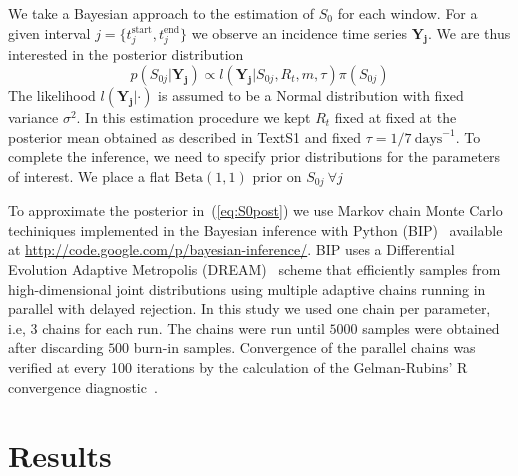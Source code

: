 We take a Bayesian approach to the estimation of $S_0$ for each window.
For a given interval $j = \{ t_j^{\text{start}}, t_j^{\text{end}} \} $ we 
observe an incidence time series $\mathbf{Y_{j}}$.
We are thus interested in the posterior distribution
\begin{equation}
 \label{eq:S0post}
 p(S_{0j}|\mathbf{Y_{j}}) \propto l(\mathbf{Y_{j}}|S_{0j}, R_t, m,  \tau 
)\pi(S_{0j}) 
\end{equation}
The likelihood $l(\mathbf{Y_{j}}|\cdot)$ is assumed to be a Normal distribution 
with fixed variance $\sigma^2$.
In this estimation procedure we kept $R_t$ fixed at fixed at the posterior mean 
obtained as described in TextS1 and fixed $\tau = 1/7\: \text{days}^{-1}$.
To complete the inference, we need to specify prior distributions for the 
parameters of interest.
We place a flat $\text{Beta}(1, 1)$ prior on $S_{0j}\:\forall j$
% 



To approximate the posterior in~(\ref{eq:S0post}) we use Markov chain Monte 
Carlo techiniques implemented in the Bayesian inference with Python 
(BIP)~\cite{pone2011} available at 
\url{http://code.google.com/p/bayesian-inference/}.
BIP uses a Differential Evolution Adaptive Metropolis (DREAM)~\cite{vrugt2008} 
scheme that efficiently samples from high-dimensional joint distributions using 
multiple adaptive chains running in parallel with delayed rejection.
In this study we used one chain per parameter, i.e, 3 chains for each run.
The chains were run until $5000$ samples were obtained after discarding $500$ 
burn-in samples.
Convergence of the parallel chains was verified at every 100 iterations by the 
calculation of the Gelman-Rubins' R convergence diagnostic~\cite{brooks1998}.
\section*{Results}

